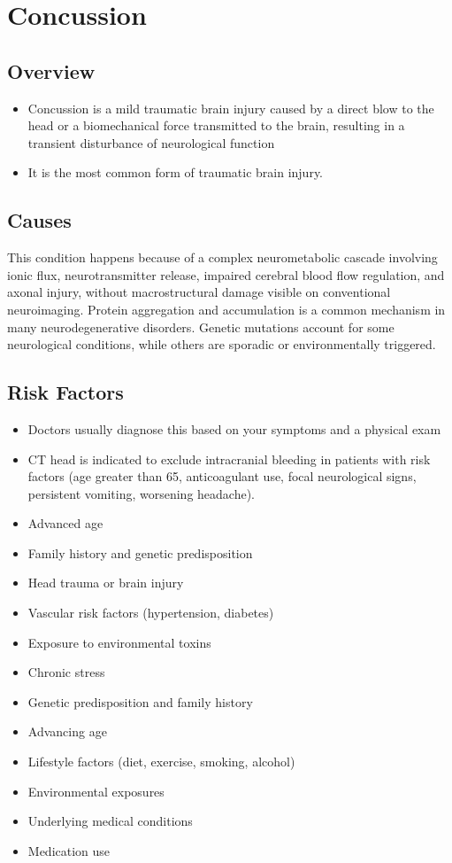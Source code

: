 \chapter{Concussion}
\label{sec:Concussion}

\section{Overview}


\begin{itemize}[noitemsep]
  \item Concussion is a mild traumatic brain injury caused by a direct blow to the head or a biomechanical force transmitted to the brain, resulting in a transient disturbance of neurological function
  \item It is the most common form of traumatic brain injury.
\end{itemize}
\section{Causes}
This condition happens because of a complex neurometabolic cascade involving ionic flux, neurotransmitter release, impaired cerebral blood flow regulation, and axonal injury, without macrostructural damage visible on conventional neuroimaging.    Protein aggregation and accumulation is a common mechanism in many neurodegenerative disorders.  Genetic mutations account for some neurological conditions, while others are sporadic or environmentally triggered.   
\section{Risk Factors}
\begin{itemize}[noitemsep]
  \item Doctors usually diagnose this based on your symptoms and a physical exam
  \item CT head is indicated to exclude intracranial bleeding in patients with risk factors (age greater than 65, anticoagulant use, focal neurological signs, persistent vomiting, worsening headache).
  \item Advanced age
  \item Family history and genetic predisposition
  \item Head trauma or brain injury
  \item Vascular risk factors (hypertension, diabetes)
  \item Exposure to environmental toxins
  \item Chronic stress
  \item Genetic predisposition and family history
  \item Advancing age
  \item Lifestyle factors (diet, exercise, smoking, alcohol)
  \item Environmental exposures
  \item Underlying medical conditions
  \item Medication use
\end{itemize}
